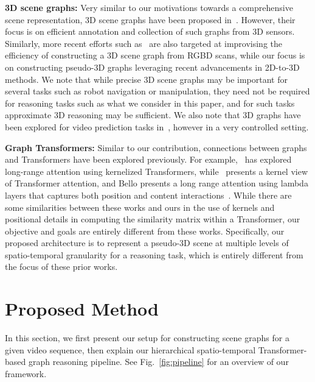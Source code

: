 \documentclass[letterpaper]{article} %
\begin{document}
\noindent\textbf{3D scene graphs:} Very similar to our motivations towards a comprehensive scene representation, 3D scene graphs have been proposed in~\cite{armeni20193d}. However, their focus is on efficient annotation and collection of such graphs from 3D sensors. Similarly, more recent efforts such as~\cite{zhang2021exploiting,wu2021scenegraphfusion} are also targeted at improvising the efficiency of constructing a 3D scene graph from RGBD scans, while our focus is on constructing pseudo-3D graphs leveraging recent advancements in 2D-to-3D methods. We note that while precise 3D scene graphs may be important for several tasks such as robot navigation or manipulation, they need not be required for reasoning tasks such as what we consider in this paper, and for such tasks approximate 3D reasoning may be sufficient. We also note that 3D graphs have been explored for video prediction tasks in~\cite{tung20203d}, however in a very controlled setting.

\noindent\textbf{Graph Transformers:} Similar to our contribution, connections between graphs and Transformers have been explored previously. For example,~\cite{choromanski2021graph} has explored long-range attention using kernelized Transformers, while~\cite{tsai2019Transformer} presents a kernel view of Transformer attention, and Bello presents a long range attention using lambda layers that captures both position and content interactions~\cite{bello2021lambdanetworks}. While there are some similarities between these works and ours in the use of kernels and positional details in computing the similarity matrix within a Transformer, our objective and goals are entirely different from these works. Specifically, our proposed architecture is to represent a pseudo-3D scene at multiple levels of spatio-temporal granularity for a reasoning task, which is entirely different from the focus of these prior works.
\section{Proposed Method}
In this section, we first present our setup for constructing \name scene graphs for a given video sequence, then explain our hierarchical spatio-temporal Transformer-based graph reasoning pipeline. See Fig.~\ref{fig:pipeline} for an overview of our framework.
\end{document}
